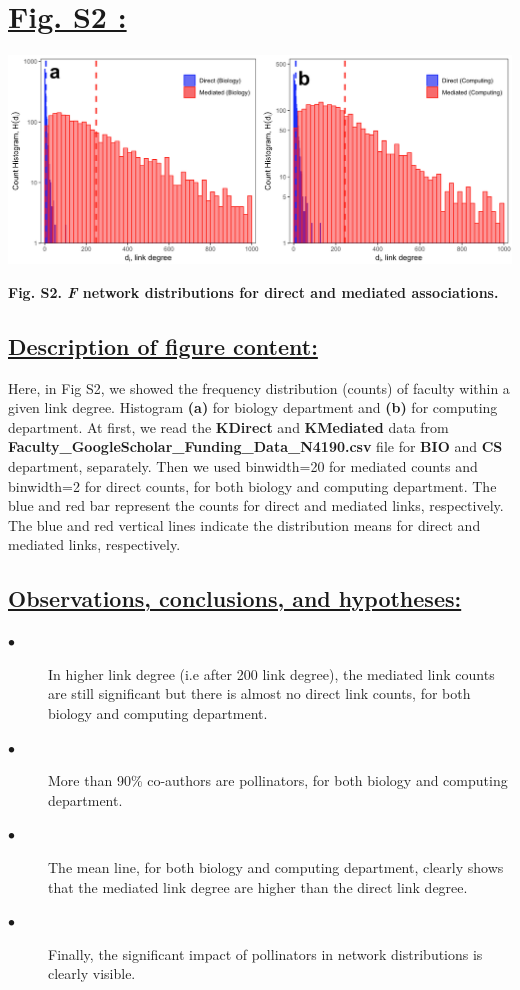 \documentclass{article}\usepackage[]{graphicx}\usepackage[]{color}
\begin{document}
\newpage
\section*{\underline{Fig. S2 :}}
\begin{center}
\includegraphics[scale=0.45]{S2.png}
\newline
\par{\textbf{Fig. S2. \textit{F} network distributions for direct and mediated associations.}}
\end{center}
\subsection*{\underline{Description of figure content:}}
\par{Here, in Fig S2, we showed the frequency distribution (counts) of faculty within a given link degree. Histogram \textbf{(a)} for biology department and \textbf{(b)} for computing department. At first, we read the \textbf{KDirect} and \textbf{KMediated} data from \textbf{Faculty\_GoogleScholar\_Funding\_Data\_N4190.csv} file for \textbf{BIO} and \textbf{CS} department, separately. Then we used binwidth=20 for mediated counts and binwidth=2 for direct counts, for both biology and computing department. The blue and red bar represent the counts for direct and mediated links, respectively. The blue and red vertical lines indicate the distribution means for direct and mediated links, respectively.}
\subsection*{\underline{Observations, conclusions, and hypotheses:}}
\begin{description}
  \item[$\bullet$] In higher link degree (i.e after 200 link degree), the mediated link counts are still significant but there is almost no direct link counts, for both biology and computing department. 
  \item[$\bullet$] More than 90\% co-authors are pollinators, for both biology and computing department. 
  \item[$\bullet$] The mean line, for both biology and computing department, clearly shows that the mediated link degree are higher than the direct link degree. 
  \item[$\bullet$] Finally, the significant impact of pollinators in network distributions is clearly visible.
\end{description}
\end{document}
